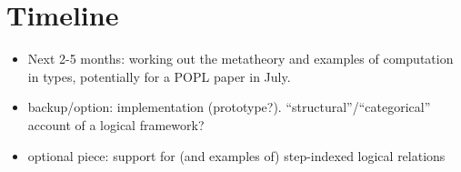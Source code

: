 \documentclass{article}
\begin{document}
\section{Timeline}
\begin{itemize}
\item Next 2-5 months: working out the metatheory and examples of computation in
types, potentially for a POPL paper in July.
\item backup/option: implementation (prototype?). ``structural''/``categorical'' account of a logical framework?
\item optional piece: support for (and examples of) step-indexed
  logical relations
\end{itemize}
\end{document}
